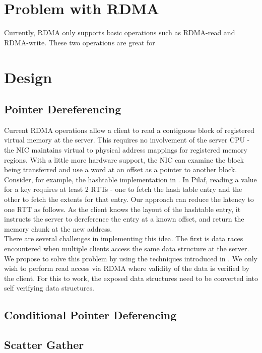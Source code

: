 \documentclass[a4paper, oneside, 12pt]{article}
\begin{document}
\section{Problem with RDMA}
Currently, RDMA only supports basic operations such as RDMA-read and
RDMA-write.  These two operations are great for
\section{Design}
\subsection{Pointer Dereferencing}
Current RDMA operations allow a client to read a contiguous block of registered
virtual memory at the server. This requires no involvement of the server CPU -
the NIC maintains virtual to physical address mappings for registered memory
regions. With a little more hardware support, the NIC can examine the block
being transferred and use a word at an offset as a pointer to another block.\\

Consider, for example, the hashtable implementation in \cite{pilaf}. In Pilaf,
reading a value for a key requires at least 2 RTTs - one to fetch the hash
table entry and the other to fetch the extents for that entry. Our approach can
reduce the latency to one RTT as follows. As the client knows the layout of the
hashtable entry, it instructs the server to dereference the entry at a known
offset, and return the memory chunk at the new address.\\

There are several challenges in implementing this idea. The first is data races
encountered when
multiple clients access the same data structure at the server. We propose to
solve this problem by using the techniques introduced in \cite{pilaf}. We only
wish to perform read access via RDMA where validity of the data is verified by
the client. For this to work, the exposed data structures need to be converted
into self verifying data structures.\\

\subsection{Conditional Pointer Deferencing}
\subsection{Scatter Gather}
\end{document}
